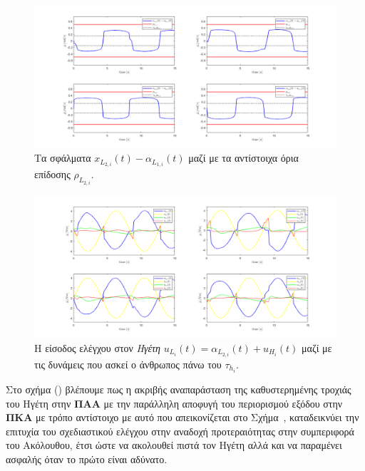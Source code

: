 \begin{figure}[H]
    \centering
    \includegraphics[width=1\linewidth]{Chapters/Chapter3/Figures/Sim1Fig8.png}
    \caption{Τα σφάλματα $x_{L_{2,i}}(t) - \alpha_{L_{1,i}}(t)$ μαζί με τα αντίστοιχα όρια επίδοσης $\rho_{L_{2,i}}$.}
    \label{Sim1Fig8}
\end{figure}

\begin{figure}[H]
    \centering
    \includegraphics[width=1\linewidth]{Chapters/Chapter3/Figures/Sim1Fig9.png}
    \caption{Η είσοδος ελέγχου στον \textit{Ηγέτη} $u_{L_{i}}(t) = \alpha_{L_{2,i}}(t) + u_{H_{i}}(t)$ μαζί με τις δυνάμεις που ασκεί ο άνθρωπος πάνω του $\tau_{h_{i}}$.}
    \label{Sim1Fig9}
\end{figure}

\begin{observation}\label{fig:obs:1}
Στο σχήμα () βλέπουμε πως η ακριβής αναπαράσταση της καθυστερημένης τροχιάς του Ηγέτη στην \textbf{ΠΑΑ} με την παράλληλη αποφυγή του περιορισμού εξόδου στην \textbf{ΠΚΑ} με τρόπο αντίστοιχο με αυτό που απεικονίζεται στο Σχήμα~, καταδεικνύει την επιτυχία του σχεδιαστικού ελέγχου στην αναδοχή προτεραιότητας στην συμπεριφορά του Ακόλουθου, έτσι ώστε να ακολουθεί πιστά τον Ηγέτη αλλά και να παραμένει ασφαλής όταν το πρώτο είναι αδύνατο.
\end{observation}

